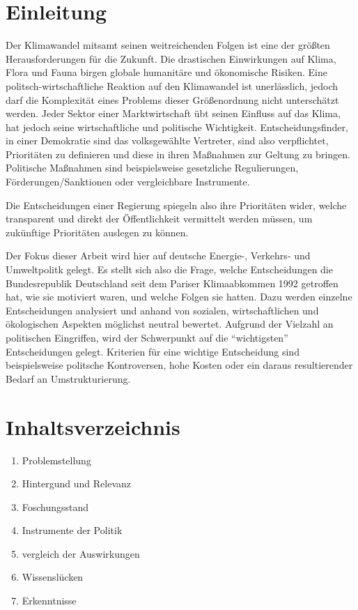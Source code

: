 \documentclass[12pt,a4paper]{article}
\title{\titlename}
\author{ Maylis Grune, Muhamedbaqir Al-Rumeil, Niklas Schmidt}
\date{\exposedate}
\begin{document}


\maketitle

\section*{Einleitung}

Der Klimawandel mitsamt seinen weitreichenden Folgen ist  eine der größten Herausforderungen für die Zukunft. 
Die drastischen Einwirkungen auf Klima, Flora und Fauna \autocite{Consequences:2023}
birgen globale humanitäre und ökonomische Risiken. 
Eine politsch-wirtschaftliche Reaktion auf den Klimawandel ist unerlässlich, 
jedoch darf die Komplexität eines Problems dieser Größenordnung nicht unterschätzt werden. Jeder Sektor einer Marktwirtschaft übt seinen 
Einfluss auf das Klima, hat jedoch seine wirtschaftliche und politische Wichtigkeit. 
Entscheidungsfinder, in einer Demokratie sind das volksgewählte Vertreter, sind also verpflichtet, Prioritäten zu definieren und diese in 
ihren Maßnahmen zur Geltung zu bringen. Politische Maßnahmen sind beispielsweise gesetzliche Regulierungen, Förderungen/Sanktionen oder vergleichbare Instrumente. 

Die Entscheidungen einer Regierung spiegeln also ihre Prioritäten wider, welche transparent und direkt der Öffentlichkeit vermittelt werden müssen, um zukünftige Prioritäten auslegen zu können. 

Der Fokus dieser Arbeit wird hier auf deutsche Energie-, Verkehrs- und Umweltpolitk gelegt. Es stellt sich also die Frage, welche Entscheidungen die Bundesrepublik Deutschland seit dem Pariser Klimaabkommen 1992 getroffen hat, wie sie motiviert waren, und welche Folgen sie hatten. Dazu werden einzelne Entscheidungen analysiert und anhand von sozialen, wirtschaftlichen und ökologischen Aspekten möglichst neutral bewertet. 
Aufgrund der Vielzahl an politischen Eingriffen, wird der Schwerpunkt auf die “wichtigsten” Entscheidungen gelegt. Kriterien für eine wichtige Entscheidung sind beispielsweise politsche Kontroversen, hohe Kosten oder ein daraus resultierender Bedarf an Umstrukturierung. 

\pagebreak
\section*{Inhaltsverzeichnis}
\begin{enumerate}
	\item Problemstellung
	\item Hintergund und Relevanz
	\item Foschungsstand
	\item Instrumente der Politik
	\item vergleich der Auswirkungen
	\item Wissenslücken
	\item Erkenntnisse
\end{enumerate}
\end{document}
